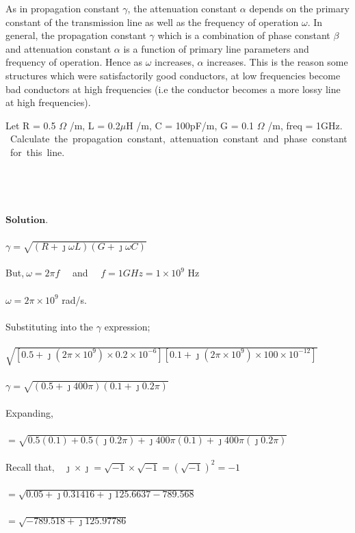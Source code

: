 As in propagation constant $\gamma$, the attenuation constant $\alpha$ depends on the primary constant of the transmission line as well as the frequency of operation $\omega$. In general, the propagation constant $\gamma$ which is a combination of phase constant $\beta$ and attenuation constant $\alpha$ is a function of primary line parameters and frequency of operation. Hence as $\omega$ increases, $\alpha$ increases. This is the reason some structures which were satisfactorily good conductors, at low frequencies become bad conductors at high frequencies (i.e the conductor becomes a more lossy line at high frequencies).

\begin{exmp}
Let R = 0.5 $\Omega$ /m, L = 0.2$\mu$H /m, C = 100pF/m, G = 0.1 $\Omega$ /m, freq = 1GHz. \ Calculate\ the\ propagation\ constant,\ attenuation\ constant\ and\ phase\ constant\ for\ this\ line. \\\\\\\\\\

$\textbf{Solution.}$\\\\
$ \gamma = \sqrt{(R+\jmath\omega L)(G + \jmath\omega C)}$\\\\
But,$ \ \omega = 2\pi f\quad$ and $\quad f = 1GHz = 1 \times 10^9 $ Hz\\\\
$ \omega = 2\pi \times 10^9 $ rad/s.\\\\
Substituting into the $ \gamma $ expression; \\\\
$\sqrt{[0.5+\jmath (2\pi \times 10^9)\times 0.2 \times 10^{-6}][0.1 + \jmath(2\pi \times 10^9) \times 100 \times10^{-12}]}  $\\\\
$ \gamma = \sqrt{(0.5 + \jmath 400\pi)(0.1 + \jmath 0.2\pi)} $\\\\
Expanding,\\\\
$ = \sqrt{0.5(0.1) + 0.5(\jmath 0.2\pi) + \jmath 400\pi(0.1) + \jmath 400\pi(\jmath 0.2\pi)} $ \\\\
Recall  that,$ \quad \jmath \times \jmath = \sqrt{-1} \times \sqrt{-1} = (\sqrt{-1})^2 = -1 $\\\\
$ =\sqrt{0.05 + \jmath 0.31416 +\jmath 125.6637 - 789.568} $ \\\\
$ = \sqrt{-789.518 + \jmath 125.97786} $ \\


\end{exmp}
